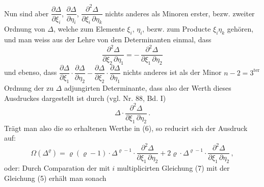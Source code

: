 Nun sind aber $\dfrac{\partial \Delta}{\partial \xi_i}$, $\dfrac{\partial \Delta}{\partial \eta_i}$, $\dfrac{\partial^2 \Delta}{\partial \xi_i\, \partial \eta_k}$ nichts anderes als Minoren erster, bezw. zweiter Ordnung von $\Delta$, welche zum Elemente $\xi_i$, $\eta_i$, bezw. zum Producte $\xi_i \eta_k$ geh\"oren, und man weiss aus der Lehre von den Determinanten einmal, dass
\[
\frac{\partial^2 \Delta}{\partial \xi_2\, \partial \eta_1} = -\, \frac{\partial^2 \Delta}{\partial \xi_1\, \partial \eta_2}
\]
und ebenso, dass $\dfrac{\partial \Delta}{\partial \xi_1} \cdot \dfrac{\partial \Delta}{\partial \eta_2} - \dfrac{\partial \Delta}{\partial \xi_2} \cdot \dfrac{\partial \Delta}{\partial \eta_1}$ nichts anderes ist als der Minor $n - 2 = 3^{\text{ter}}$ Ordnung der zu $\Delta$ adjungirten Determinante, dass also der Werth dieses Ausdruckes dargestellt ist durch (vgl. Nr. 88, Bd. I)
\[
\Delta \cdot \frac{\partial^2 \Delta}{\partial \xi_1\, \partial \eta_2}\,.
\]
Tr\"agt man also die so erhaltenen Werthe in (6), so reducirt sich der Ausdruck auf:
\[
\Omega(\Delta^{\varrho}) = \varrho(\varrho - 1)\cdot \Delta^{\varrho-1}\cdot \frac{\partial^2 \Delta}{\partial \xi_1\, \partial \eta_2} + 2\varrho \cdot \Delta^{\varrho-1}\cdot \frac{\partial^2 \Delta}{\partial \xi_1\, \partial \eta_2}\,,
\]
oder:
Durch Comparation der mit $i$ multiplicirten Gleichung (7) mit der Gleichung (5) erh\"alt man sonach

